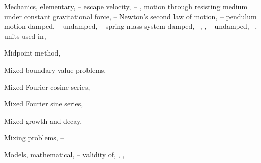 \begin{theindex}
  \item Mechanics, elementary, \pageref{eq:4.3.1}--\pageref{exer:4.4.24}
    \subitem escape velocity, \pageref{eq:4.3.18}--\pageref{eq:4.3.24} \pageref{exer:4.3.17}, \pageref{exer:4.3.20}
    \subitem motion through resisting medium under constant gravitational force, \pageref{eq:4.3.3}--\pageref{eq:4.3.17}
    \subitem Newton's second law of motion, \pageref{eq:4.3.1}--\pageref{eq:4.3.3}
    \subitem pendulum motion
      \subsubitem damped, \pageref{example:4.4.5}--\pageref{exer:4.4.1}
      \subsubitem undamped, \pageref{eq:4.4.26}--\pageref{eq:4.4.17}
    \subitem spring-mass system
      \subsubitem damped, \pageref{eq:4.4.26}--\pageref{example:4.4.5}, \pageref{eq:6.1.2}, \pageref{eq:6.2.1}--\pageref{exer:6.2.26}
      \subsubitem undamped, \pageref{eq:4.4.8}--\pageref{eq:4.4.26},\pageref{eq:6.1.1}
    \subitem units used in, \pageref{eq:4.3.1}

  \item Midpoint method, \pageref{eq:3.2.1}

  \item Mixed boundary value problems, \pageref{eq:12.3.2}

  \item Mixed Fourier cosine series, \pageref{eq:11.3.2}--\pageref{example:11.3.3}

  \item Mixed Fourier sine series, \pageref{thmtype:11.3.4}

  \item Mixed growth and decay, \pageref{example:4.1.4}

  \item Mixing problems, \pageref{example:4.2.3}--\pageref{exer:4.2.1}

  \item Models, mathematical, \pageref{eq:1.1.1}--\pageref{eq:1.1.3}
    \subitem validity of, \pageref{eq:4.1.15}, \pageref{eq:4.2.1}, \pageref{exer:4.2.17}


\end{theindex}
